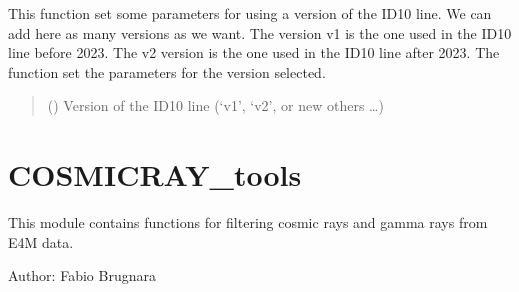 \documentclass[letterpaper,10pt,english]{sphinxmanual}
\begin{document}

\begin{fulllineitems}
\label{\detokenize{index:ID10_tools.set_version}}
\pysigstartsignatures
\pysiglinewithargsret
{}
{}
{}
\pysigstopsignatures
\sphinxAtStartPar
This function set some parameters for using a version of the ID10 line. We can add here as many versions as we want. The version v1 is the one used in the ID10 line before 2023. The v2 version is the one used in the ID10 line after 2023. The function set the parameters for the version selected.
\begin{quote}\begin{description}
\sphinxAtStartPar
{} () \textendash{} Version of the ID10 line (‘v1’, ‘v2’, or new others …)

\end{description}\end{quote}

\end{fulllineitems}


\chapter{COSMICRAY\_tools}
\label{\detokenize{index:cosmicray-tools}}\label{\detokenize{index:module-COSMICRAY_tools}}
\sphinxAtStartPar
This module contains functions for filtering cosmic rays and gamma rays from E4M data.

\sphinxAtStartPar
Author: Fabio Brugnara
\end{document}
